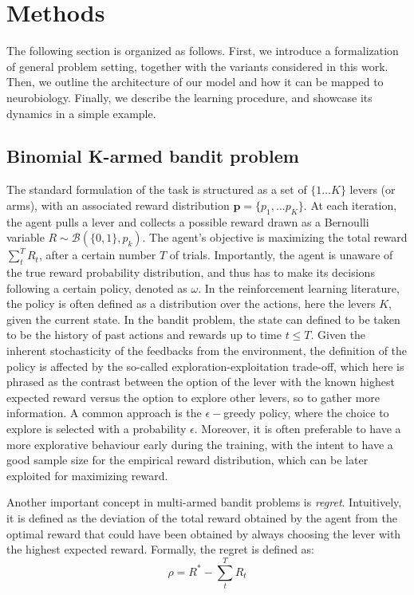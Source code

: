

\section{Methods}

\noindent The following section is organized as follows. First, we introduce a formalization of general problem setting, together with the variants considered in this work. Then, we outline the architecture of our model and how it can be mapped to neurobiology. Finally, we describe the learning procedure,
and showcase its dynamics in a simple example.

\subsection{Binomial K-armed bandit problem}
\hfill \break
\noindent The standard formulation of the task is structured as a set of $\{1\dots K\}$ levers (or arms), with an associated reward distribution $\mathbf{p}=\{p_{1}, \ldots p_{K}\}$.
At each iteration, the agent pulls a lever and collects a possible reward drawn as a Bernoulli variable $R\sim \mathcal{B}(\{0,1\},p_{k})$. The agent's objective is maximizing the total reward $\sum^{T}_{t} R_{t}$, after a certain number $T$ of trials.
Importantly, the agent is unaware of the true reward probability distribution, and thus has to make its decisions following a certain policy, denoted as $\omega$.
In the reinforcement learning literature, the policy is often defined as a distribution over the actions, here the levers $K$, given the current state. In the bandit problem, the state can defined to be taken to be the history of past actions and rewards up to time $t\leq T$.
Given the inherent stochasticity of the feedbacks from the environment, the definition of the policy is affected by the so-called exploration-exploitation trade-off, which here is phrased as the contrast between the option of the lever with the known highest expected reward versus the option to explore other levers, so to gather more information.
A common approach is the $\epsilon-$greedy policy, where the choice to explore is selected with a probability $\epsilon$.
Moreover, it is often preferable to have a more explorative behaviour early during the training, with the intent to have a good sample size for the empirical reward distribution, which can be later exploited for maximizing reward.

Another important concept in multi-armed bandit problems is \textit{regret}. Intuitively, it is defined as the deviation of the total reward obtained by the agent from the optimal reward that could have been obtained by always choosing the lever with the highest expected reward.
Formally, the regret is defined as:
\begin{equation}
    \rho=R^{*} - \sum^{T}_{t} R_{t}
\end{equation}

